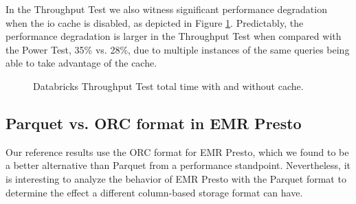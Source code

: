 In the Throughput Test we also witness significant performance degradation when the io cache is disabled, as depicted in Figure \ref{fig:additionalResultsDatabricksNoCacheTputTest}. Predictably, the performance degradation is larger in the Throughput Test when compared with the Power Test, 35\% vs. 28\%, due to multiple instances of the same queries being able to take advantage of the cache.

\begin{figure}
   \begin{center}
   \end{center}
   \caption{Databricks Throughput Test total time with and without cache.}
   \label{fig:additionalResultsDatabricksNoCacheTputTest}
\end{figure}

\subsection{Parquet vs. ORC format in EMR Presto}

Our reference results use the ORC format for EMR Presto, which we found to be a better alternative than Parquet from a performance standpoint. Nevertheless, it is interesting to analyze the behavior of EMR Presto with the Parquet format to determine the effect a different column-based storage format can have.

